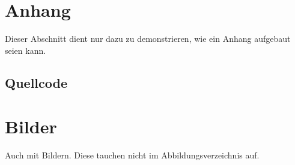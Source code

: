 \section{Anhang}\label{Anhang}
Dieser Abschnitt dient nur dazu zu demonstrieren, wie ein Anhang aufgebaut seien kann.
\subsection{Quellcode}

\section{Bilder}
Auch mit Bildern.
Diese tauchen nicht im Abbildungsverzeichnis auf.
